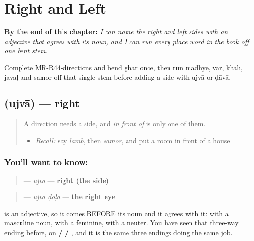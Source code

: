 
\chapter{Right and Left}
\label{ch:mr-right-and-left}

\begin{chapteropening}
\textbf{By the end of this chapter:} \emph{I can name the right and left sides with an adjective that agrees with its noun, and I can run every place word in the book off one bent stem.}

Complete MR-R44-directions and bend ghar once, then run madhye, var, khālī, javaḷ and samor off that single stem before adding a side with ujvā or ḍāvā.
\end{chapteropening}

\section[\texorpdfstring{\mr{उजवा} (ujvā)}{उजवा (ujvā)}]{ (ujvā) — right}

\label{lesson:MR-C44-ujva}



\begin{quote}
A direction needs a side, and \emph{in front of} is only one of them.

\begin{itemize}
\raggedright
  \item \emph{Recall:} say \emph{lāmb}, then \emph{samor}, and put a room in front of a house
\end{itemize}
\end{quote}

\subsection*{You'll want to know: }
\begin{quote}
\textbf{} — \emph{ujvā} — \textbf{right (the side)}
\end{quote}

\begin{quote}
\textbf{ } — \emph{ujvā ḍoḷā} — \textbf{the right eye}
\end{quote}

\textbf{} is an adjective, so it comes BEFORE its noun and it agrees with it: \textbf{} with a masculine noun, \textbf{} with a feminine, \textbf{} with a neuter. You have seen that three-way ending before, on \textbf{ /  / }, and it is the same three endings doing the same job.

